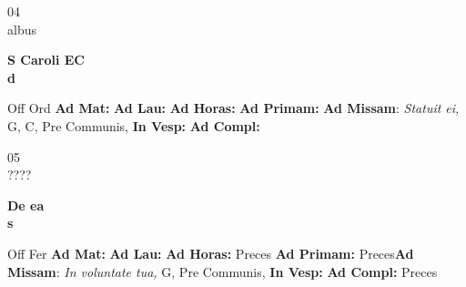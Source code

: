 \documentclass[10pt, openany]{book}
\begin{document}
    \begin{center}
        \begin{minipage}{3.5in}
            \vspace{2em}
            \begin{minipage}{0.5in}
                {\Huge 04} \\
                {\normalsize albus}
            \end{minipage}
            \begin{minipage}{3.0in}
                \textbf{ \large S Caroli EC \\
                \textnormal{\normalsize d}}

            \end{minipage}
            \begin{justify}Off Ord
                \textbf{Ad Mat: }
                \textbf{Ad Lau: }
                \textbf{Ad Horas: }
                \textbf{Ad Primam: }\textbf{Ad Missam}: \textit{Statuit ei,} G, C, Pre Communis, 
                \textbf{In Vesp: }
                \textbf{Ad Compl: }
            \end{justify}
        \end{minipage}
    \end{center}

    \begin{center}
        \begin{minipage}{3.5in}
            \vspace{2em}
            \begin{minipage}{0.5in}
                {\Huge 05} \\
                {\normalsize ????}
            \end{minipage}
            \begin{minipage}{3.0in}
                \textbf{ \large De ea \\
                \textnormal{\normalsize s}}

            \end{minipage}
            \begin{justify}Off Fer
                \textbf{Ad Mat: }
                \textbf{Ad Lau: }
                \textbf{Ad Horas: }Preces
                \textbf{Ad Primam: }Preces\textbf{Ad Missam}: \textit{In voluntate tua,} G, Pre Communis, 
                \textbf{In Vesp: }
                \textbf{Ad Compl: }Preces
            \end{justify}
        \end{minipage}
    \end{center}
\end{document}
